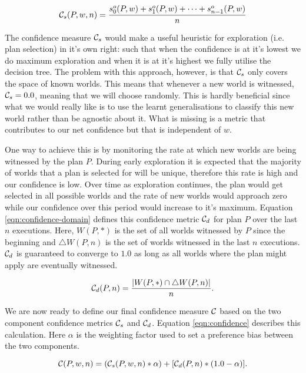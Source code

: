 \begin{equation}
{\ensuremath{\mathcal{C}}}_s(P,w,n) = \frac{s^o_0(P,w) + s^o_1(P,w) + \cdots + s^o_{n-1}(P,w)}{n}
\label{eqn:confidence-stability}
\end{equation}


The confidence measure ${\mathcal{C}}_s$ would make a useful heuristic for exploration (i.e. plan selection) in it's own right: such that when the confidence is at it's lowest we do maximum exploration and when it is at it's highest we fully utilise the decision tree. The problem with this approach, however, is that ${\mathcal{C}}_s$ only covers the space of known worlds. This means that whenever a new world is witnessed, ${\mathcal{C}}_s=0.0$, meaning that we will choose randomly. This is hardly beneficial since what we would really like is to use the learnt generalisations to classify this new world rather than be agnostic about it. What is missing is a metric that contributes to our net confidence but that is independent of $w$.

One way to achieve this is by monitoring the rate at which new worlds are being witnessed by the plan $P$. During early exploration it is expected that the majority of worlds that a plan is selected for will be unique, therefore this rate is high and our confidence is low. Over time as exploration continues, the plan would get selected in all possible worlds and the rate of new worlds would approach zero while our confidence over this period would increase to it's maximum.  Equation \ref{eqn:confidence-domain} defines this confidence metric ${\mathcal{C}}_d$ for plan $P$ over the last $n$ executions. Here, $W(P,*)$ is the set of all worlds witnessed by $P$ since the beginning and $\triangle W(P,n)$ is the set of worlds witnessed in the last $n$ executions. ${\mathcal{C}}_d$ is guaranteed to converge to $1.0$ as long as all worlds where the plan might apply are eventually witnessed.

\begin{equation}
{\ensuremath{\mathcal{C}}}_d(P,n) = \frac{|W(P,*)\cap \triangle W(P,n) |}{n}.
\label{eqn:confidence-domain}
\end{equation}

We are now ready to define our final confidence measure ${\mathcal{C}}$ based on the two component confidence metrics ${\mathcal{C}}_s$ and ${\mathcal{C}}_d$. Equation \ref{eqn:confidence} describes this calculation. Here $\alpha$ is the weighting factor used to set a preference bias between the two components.

\begin{equation}
{\ensuremath{\mathcal{C}}}(P,w,n) = ({\mathcal{C}}_s(P,w,n)*\alpha) + [{\mathcal{C}}_d(P,n)*(1.0-\alpha)].
\label{eqn:confidence}
\end{equation}

